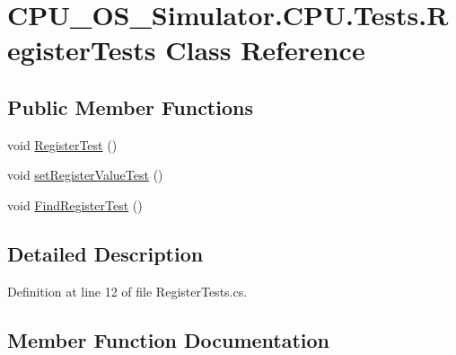 \hypertarget{class_c_p_u___o_s___simulator_1_1_c_p_u_1_1_tests_1_1_register_tests}{}\section{C\+P\+U\+\_\+\+O\+S\+\_\+\+Simulator.\+C\+P\+U.\+Tests.\+Register\+Tests Class Reference}
\label{class_c_p_u___o_s___simulator_1_1_c_p_u_1_1_tests_1_1_register_tests}
\subsection*{Public Member Functions}
\begin{DoxyCompactItemize}
\item 
void \hyperlink{class_c_p_u___o_s___simulator_1_1_c_p_u_1_1_tests_1_1_register_tests_a1fdf6a35fde71647f9b85c74d9893476}{Register\+Test} ()
\item 
void \hyperlink{class_c_p_u___o_s___simulator_1_1_c_p_u_1_1_tests_1_1_register_tests_a50a7835c27a463a0a36ae36ecf139271}{set\+Register\+Value\+Test} ()
\item 
void \hyperlink{class_c_p_u___o_s___simulator_1_1_c_p_u_1_1_tests_1_1_register_tests_ac5bd928d3c3538b8b4bf5b75e6ec7867}{Find\+Register\+Test} ()
\end{DoxyCompactItemize}


\subsection{Detailed Description}


Definition at line 12 of file Register\+Tests.\+cs.



\subsection{Member Function Documentation}
\hypertarget{class_c_p_u___o_s___simulator_1_1_c_p_u_1_1_tests_1_1_register_tests_ac5bd928d3c3538b8b4bf5b75e6ec7867}{}
